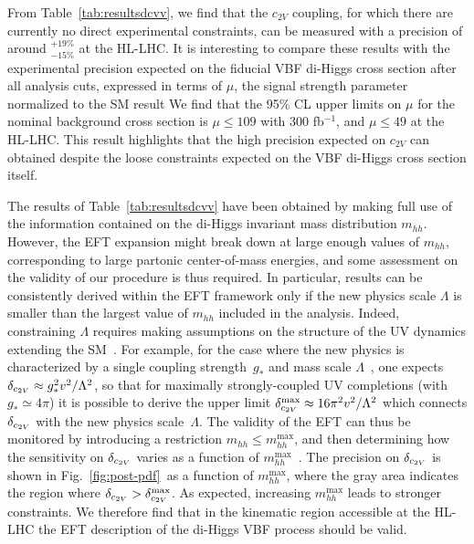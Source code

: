 From Table~\ref{tab:resultsdcvv}, we find that the $c_{2V}$ coupling, for which
there are currently no direct experimental constraints, can be measured 
with a precision of
around  $_{-15\%}^{+19\%}$ at the HL-LHC. 
%
It is interesting to compare these results with the experimental precision
expected on the fiducial VBF di-Higgs cross section after all
analysis cuts, expressed in terms of $\mu$, the signal strength parameter normalized to the SM result 
%
We find that the 95\% CL upper limits on $\mu$ for the nominal background cross section
is $\mu\le 109$ with 300 fb$^{-1}$, and $\mu\le 49$ at the HL-LHC.
%
This result highlights  that the high precision expected on
$c_{2V}$ can obtained despite the loose constraints expected
on the VBF di-Higgs cross section itself.

The results of Table~\ref{tab:resultsdcvv}
have been obtained by making full use of the information
contained on the di-Higgs invariant mass distribution $m_{hh}$.
%
However, the EFT expansion might break down at large enough values of
$m_{hh}$, corresponding to large partonic center-of-mass energies,
and some assessment on the validity of our procedure is thus required.
%
In particular, results can be consistently derived within the EFT
framework only if the new physics scale $\Lambda$ is smaller than the largest value of $m_{hh}$ included in the analysis.
%
Indeed, constraining $\Lambda$
requires making assumptions on the structure of the UV dynamics extending the SM~\cite{Contino:2016jqw}.
%
For example, for the case where the new physics is characterized by a single 
coupling strength~$g_*$ and mass scale $\Lambda$~\cite{Giudice:2007fh}, one expects $
\delta_{c_{2V}} \approx g_*^2 v^2/\Lambda^2$, so that
for maximally strongly-coupled UV completions (with $g_* \simeq 4\pi$)
it is possible to derive the upper limit
$\delta_{c_{2V}}^\text{max} \approx 16\pi^2 v^2/\Lambda^2$
which connects $\delta_{c_{2V}}$ with the new physics scale~$\Lambda$.
%
The validity of the EFT can thus be monitored
by introducing a restriction $m_{hh} \leq  m_{hh}^\text{max}$, and
then determining how the sensitivity on $\delta_{c_{2V}}$ varies as a function of 
$m_{hh}^\text{max}$~\cite{Contino:2016jqw}.
%
The precision on ${\delta_{c_{2V}}}$
is shown in Fig.~\ref{fig:post-pdf}~as a function of  $m_{hh}^{\max}$,
where the gray area indicates the region where $\delta_{c_{2V}} > \delta_{c_{2V}}^\text{max}$.
%
As expected, increasing $m_{hh}^\text{max}$
leads to stronger constraints.
%
We therefore find that in the kinematic region accessible at the HL-LHC the
EFT description of the di-Higgs VBF process should be valid.